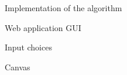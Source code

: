 \documentclass[9pt]{extarticle}
\begin{document}
\begin{section}{Implementation of the algorithm}
\begin{subsection}{Web application GUI}
\begin{subsubsection}{Input choices}

                




            \end{subsubsection}

            \begin{subsubsection}{Canvas}
            \end{subsubsection}
            

\end{subsection}
\end{section}
\end{document}
